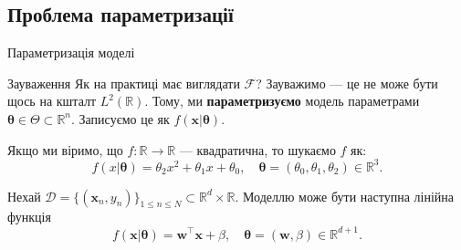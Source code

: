 \documentclass{zkdl-presentation-template}
\begin{document}
    \subsection{Проблема параметризації}
    \begin{frame}{Параметризація моделі}
        \begin{block}{Зауваження}
            Як на практиці має виглядати $\mathcal{F}$? Зауважимо --- це не може
            бути щось на кшталт $L^2(\mathbb{R})$. Тому, ми
            \textbf{параметризуємо} модель параметрами $\boldsymbol{\theta} \in
            \Theta \subset \mathbb{R}^n$. Записуємо це як
            $f(\boldsymbol{x}|\boldsymbol{\theta})$.
        \end{block}

        \begin{example}
            Якщо ми віримо, що $f: \mathbb{R} \to \mathbb{R}$ --- квадратична, то
            шукаємо $f$ як:
            \begin{equation*}
                f(x|\boldsymbol{\theta}) = \theta_2 x^2 + \theta_1 x + \theta_0, \quad \boldsymbol{\theta} = (\theta_0, \theta_1, \theta_2) \in \mathbb{R}^3.
            \end{equation*}
        \end{example}

        \begin{example}
            Нехай $\mathcal{D} = \{(\boldsymbol{x}_n,y_n)\}_{1 \leq n \leq N}
            \subset \mathbb{R}^d \times \mathbb{R}$. Моделлю може бути наступна
            лінійна функція
            \begin{equation*}
                f(\boldsymbol{x}|\boldsymbol{\theta}) = \boldsymbol{w}^{\top} \boldsymbol{x} + \beta, \quad \boldsymbol{\theta} = (\boldsymbol{w}, \beta) \in \mathbb{R}^{d+1}.
            \end{equation*}
        \end{example}
    \end{frame}
\end{document}
